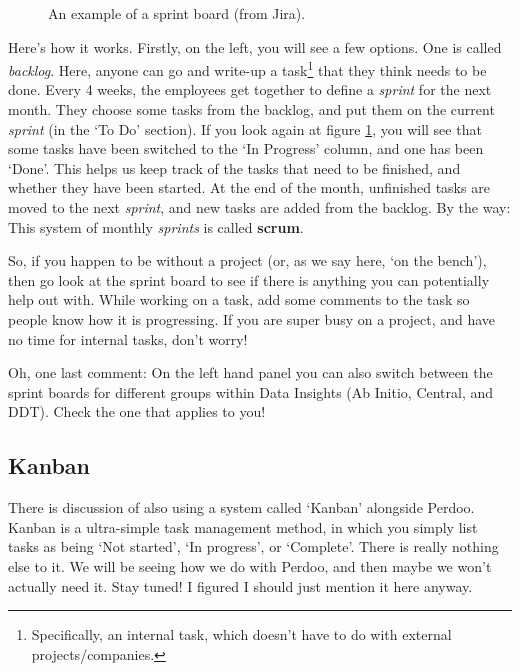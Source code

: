 \documentclass[11pt]{report}
\begin{document}
\begin{figure}[!htb]
       \caption{\label{fig:Sprint Board} An example of a sprint board (from Jira).}
\end{figure}
Here's how it works. Firstly, on the left, you will see a few options. One is called \emph{backlog}. Here, anyone can go and write-up a task\footnote{Specifically, an internal task, which doesn't have to do with external projects/companies.} that they think needs to be done. Every 4 weeks, the employees get together to define a \emph{sprint} for the next month. They choose some tasks from the backlog, and put them on the current \emph{sprint} (in the `To Do' section). If you look again at figure \ref{fig:Sprint Board}, you will see that some tasks have been switched to the `In Progress' column, and one has been `Done'. This helps us keep track of the tasks that need to be finished, and whether they have been started. At the end of the month, unfinished tasks are moved to the next \emph{sprint}, and new tasks are added from the backlog. By the way: This system of monthly \emph{sprints} is called \textbf{scrum}.

So, if you happen to be without a project (or, as we say here, `on the bench'), then go look at the sprint board to see if there is anything you can potentially help out with. While working on a task, add some comments to the task so people know how it is progressing. If you are super busy on a project, and have no time for internal tasks, don't worry!

Oh, one last comment: On the left hand panel you can also switch between the sprint boards for different groups within Data Insights (Ab Initio, Central, and DDT). Check the one that applies to you!

\subsection{Kanban}
There is discussion of also using a system called `Kanban' alongside Perdoo. Kanban is a ultra-simple task management method, in which you simply list tasks as being `Not started', `In progress', or `Complete'. There is really nothing else to it. We will be seeing how we do with Perdoo, and then maybe we won't actually need it. Stay tuned! I figured I should just mention it here anyway.
\end{document}
